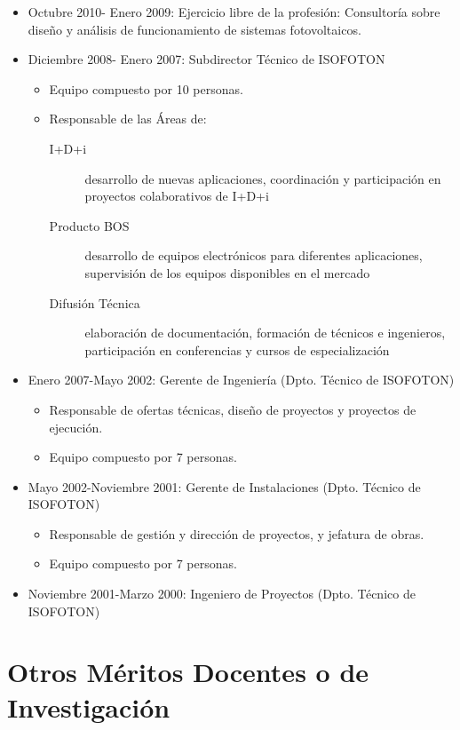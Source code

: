 \documentclass[article, a4paper]{memoir}
\begin{document}
\begin{itemize}
\item Octubre 2010- Enero 2009: Ejercicio libre de la profesión:
Consultoría sobre diseño y análisis de funcionamiento de sistemas fotovoltaicos.

\item Diciembre 2008- Enero 2007: Subdirector Técnico de ISOFOTON
\begin{itemize}
\item Equipo compuesto por 10 personas.
\item Responsable de las Áreas de:
\begin{description}
\item[{I+D+i}] desarrollo de nuevas aplicaciones, coordinación y participación en proyectos colaborativos de I+D+i
\item[{Producto BOS}] desarrollo de equipos electrónicos para diferentes aplicaciones, supervisión de los equipos disponibles en el mercado
\item[{Difusión Técnica}] elaboración de documentación, formación de técnicos e ingenieros, participación en conferencias y cursos de especialización
\end{description}
\end{itemize}

\item Enero 2007-Mayo 2002: Gerente de Ingeniería (Dpto. Técnico de ISOFOTON)
\begin{itemize}
\item Responsable de ofertas técnicas, diseño de proyectos y proyectos de ejecución.
\item Equipo compuesto por 7 personas.
\end{itemize}

\item Mayo 2002-Noviembre 2001: Gerente de Instalaciones (Dpto. Técnico de ISOFOTON)
\begin{itemize}
\item Responsable de gestión y dirección de proyectos, y jefatura de obras.
\item Equipo compuesto por 7 personas.
\end{itemize}

\item Noviembre 2001-Marzo 2000: Ingeniero de Proyectos (Dpto. Técnico de ISOFOTON)
\end{itemize}



\section{Otros Méritos Docentes o de Investigación}
\label{sec:orgheadline87}
\end{document}
